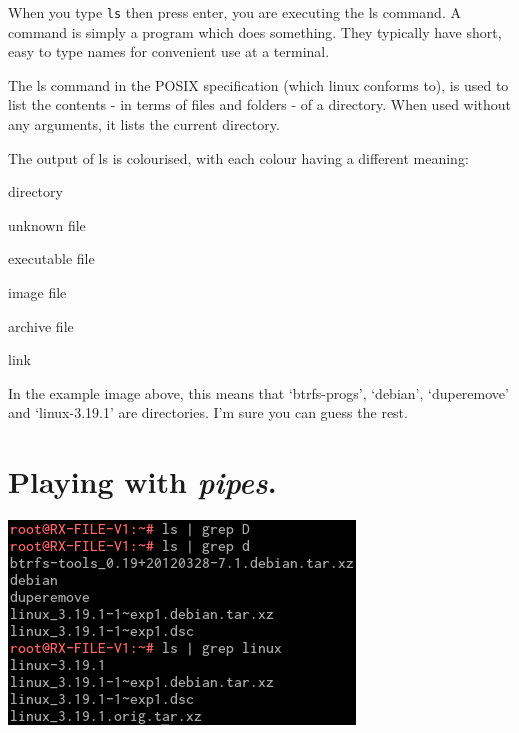 \documentclass[11pt,twoside,a4paper]{article}
\begin{document}
		When you type \verb|ls| then press enter, you are executing the ls command. A command is simply a program which does something. They typically have short, easy to type names for convenient use at a terminal.

		The ls command in the POSIX specification (which linux conforms to), is used to list the contents - in terms of files and folders - of a directory. When used without any arguments, it lists the current directory.

		\begin{samepage}

			The output of ls is colourised, with each colour having a different meaning:\cite{ls-colours}

			\begin{description}[leftmargin=!,labelwidth=\widthof{\bfseries Light Blue}]
			    \item[Blue] directory

			    \item[White] unknown file
			    \item[Green] executable file
			    \item[Pink] image file
			    \item[Red] archive file

			    \item[Light Blue] link
			\end{description}

			In the example image above, this means that `btrfs-progs', `debian', `duperemove' and `linux-3.19.1' are directories. I'm sure you can guess the rest.

		\end{samepage}

	\section{Playing with \emph{pipes}.}

		\includegraphics{ls-grep}
\end{document}
